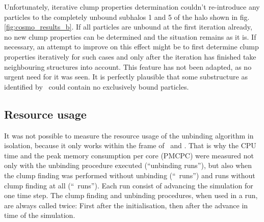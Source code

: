 Unfortunately, iterative clump properties determination couldn't re-introduce any particles to the completely unbound subhalos 1 and 5 of the halo shown in fig. \ref{fig:cosmo_results_b}. 
If all particles are unbound at the first iteration already, no new clump properties can be determined and the situation remains as it is.
If necessary, an attempt to improve on this effect might be to first determine clump properties iteratively for such cases and only after the iteration has finished take neighbouring structures into account.
This feature has not been adapted, as no urgent need for it was seen.
It is perfectly plausible that some substructure as identified by \phew\ could contain no exclusively bound particles. 








































\subsection{Resource usage}




It was not possible to measure the resource usage of the unbinding algorithm in isolation, because it only works within the frame of \ramses\ and \phew. 
That is why the CPU time and the peak memory consumption per core (PMCPC) were measured not only with the unbinding procedure executed (``unbinding runs''), but also when the clump finding was performed without unbinding (``\phew\ runs'') and runs without clump finding at all (``\ramses\ runs'').
Each run consist of advancing the simulation for one time step.
The clump finding and unbinding procedures, when used in a run, are always called twice: First after the initialisation, then after the advance in time of the simulation.

